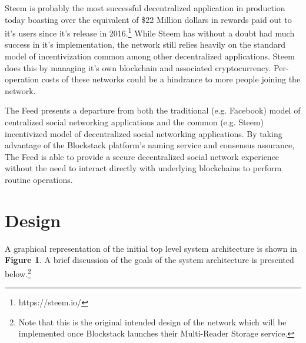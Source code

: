 \documentclass[pageno]{jpaper}
\begin{document}
\begin{multicols*}{2}
Steem\cite{steem} is probably the most successful decentralized application in production today boasting over the equivalent of \$22 Million dollars in rewards paid out to it's users since it's release in 2016.\footnote{https://steem.io/} While Steem has without a doubt had much success in it's implementation, the network still relies heavily on the standard model of incentivization common among other decentralized applications. Steem does this by managing it's own blockchain and associated cryptocurrency. Per-operation costs of these networks could be a hindrance to more people joining the network.\par
The Feed presents a departure from both the traditional (e.g. Facebook) model of centralized social networking applications and the common (e.g. Steem) incentivized model of decentralized social networking applications. By taking advantage of the Blockstack platform's naming service and consensus assurance, The Feed is  able to provide a secure decentralized social network experience without the need to interact directly with underlying blockchains to perform routine operations.\newline


\section{Design}
\label{section:design}

A graphical representation of the initial top level system architecture is shown in \textbf{Figure 1}. A brief discussion of the goals of the system architecture is presented below.\footnote{Note that this is the original intended design of the network which will be implemented once Blockstack launches their Multi-Reader Storage service.}


\end{multicols*}
\end{document}
